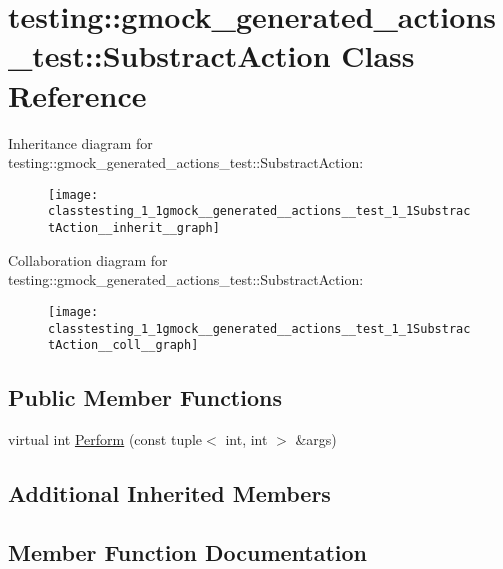 \hypertarget{classtesting_1_1gmock__generated__actions__test_1_1SubstractAction}{}\section{testing\+:\+:gmock\+\_\+generated\+\_\+actions\+\_\+test\+:\+:Substract\+Action Class Reference}
\label{classtesting_1_1gmock__generated__actions__test_1_1SubstractAction}


Inheritance diagram for testing\+:\+:gmock\+\_\+generated\+\_\+actions\+\_\+test\+:\+:Substract\+Action\+:
\nopagebreak
\begin{figure}[H]
\begin{center}
\leavevmode
\texttt{[image: classtesting\_1\_1gmock\_\_generated\_\_actions\_\_test\_1\_1SubstractAction\_\_inherit\_\_graph]}
\end{center}
\end{figure}


Collaboration diagram for testing\+:\+:gmock\+\_\+generated\+\_\+actions\+\_\+test\+:\+:Substract\+Action\+:
\nopagebreak
\begin{figure}[H]
\begin{center}
\leavevmode
\texttt{[image: classtesting\_1\_1gmock\_\_generated\_\_actions\_\_test\_1\_1SubstractAction\_\_coll\_\_graph]}
\end{center}
\end{figure}
\subsection*{Public Member Functions}
\begin{DoxyCompactItemize}
\item 
virtual int \hyperlink{classtesting_1_1gmock__generated__actions__test_1_1SubstractAction_ac049ec6196668e17ef7384e08914f2c3}{Perform} (const tuple$<$ int, int $>$ \&args)
\end{DoxyCompactItemize}
\subsection*{Additional Inherited Members}


\subsection{Member Function Documentation}

